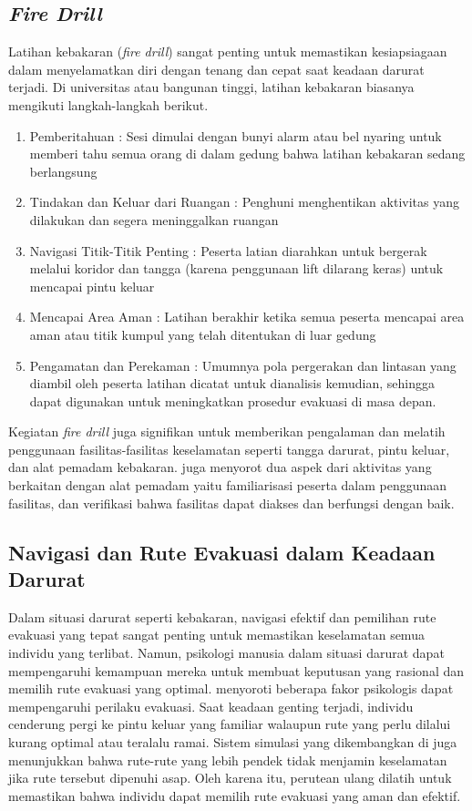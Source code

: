 \subsection{\textit{Fire Drill}}
Latihan kebakaran (\textit{fire drill}) sangat penting untuk memastikan kesiapsiagaan dalam menyelamatkan diri dengan tenang dan cepat saat keadaan darurat terjadi. 
Di universitas atau bangunan tinggi, latihan kebakaran biasanya mengikuti langkah-langkah berikut\cite{Zhang_Ding_Chraibi_Huang_2025}.
\begin{enumerate}
	\item Pemberitahuan : Sesi dimulai dengan bunyi alarm atau bel nyaring untuk memberi tahu semua orang di dalam gedung bahwa latihan kebakaran sedang berlangsung
	\item Tindakan dan Keluar dari Ruangan : Penghuni menghentikan aktivitas yang dilakukan dan segera meninggalkan ruangan
	\item Navigasi Titik-Titik Penting : Peserta latian diarahkan untuk bergerak melalui koridor dan tangga (karena penggunaan lift dilarang keras) untuk mencapai pintu keluar
	\item Mencapai Area Aman : Latihan berakhir ketika semua peserta mencapai area aman atau titik kumpul yang telah ditentukan di luar gedung
	\item Pengamatan dan Perekaman : Umumnya pola pergerakan dan lintasan yang diambil oleh peserta latihan dicatat untuk dianalisis kemudian, sehingga dapat digunakan untuk meningkatkan prosedur evakuasi di masa depan.
\end{enumerate}
Kegiatan \textit{fire drill} juga signifikan untuk memberikan pengalaman dan melatih penggunaan fasilitas-fasilitas keselamatan seperti tangga darurat, pintu keluar, dan alat pemadam kebakaran. \cite{Zhang_Ding_Chraibi_Huang_2025} juga menyorot dua aspek dari aktivitas yang berkaitan dengan alat pemadam yaitu familiarisasi peserta dalam penggunaan fasilitas, dan verifikasi bahwa fasilitas dapat diakses dan berfungsi dengan baik.

\subsection{Navigasi dan Rute Evakuasi dalam Keadaan Darurat}
Dalam situasi darurat seperti kebakaran, navigasi efektif dan pemilihan rute evakuasi yang tepat sangat penting untuk memastikan keselamatan semua individu yang terlibat. Namun, psikologi manusia dalam situasi darurat dapat mempengaruhi kemampuan mereka untuk membuat keputusan yang rasional dan memilih rute evakuasi yang optimal. \cite{Akter_Sultana_Hossain_Datta_Tutul_2026} menyoroti beberapa fakor psikologis dapat mempengaruhi perilaku evakuasi. Saat keadaan genting terjadi, individu cenderung pergi ke pintu keluar yang familiar walaupun rute yang perlu dilalui kurang optimal atau teralalu ramai. Sistem simulasi yang dikembangkan di \cite{Oikonomou_Boulougaris_Kolomvatsos_2025} juga menunjukkan bahwa rute-rute yang lebih pendek tidak menjamin keselamatan jika rute tersebut dipenuhi asap. Oleh karena itu, perutean ulang dilatih untuk memastikan bahwa individu dapat memilih rute evakuasi yang aman dan efektif.
